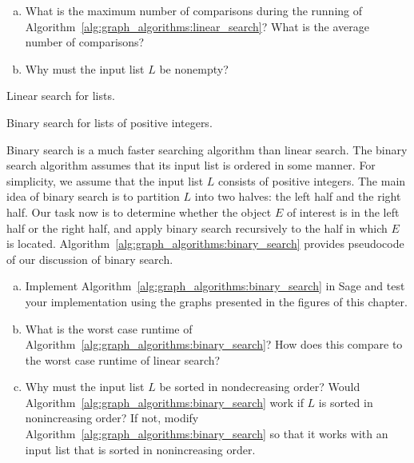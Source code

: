 \begin{problem}
\begin{enumerate}[(a)]
  \item What is the maximum number of comparisons during the running
    of Algorithm~\ref{alg:graph_algorithms:linear_search}? What is the
    average number of comparisons?

  \item Why must the input list $L$ be nonempty?
  \end{enumerate}

\begin{algorithm}[!htbp]

\caption{Linear search for lists.}
\label{alg:graph_algorithms:linear_search}
\end{algorithm}

\begin{algorithm}[!htbp]

\caption{Binary search for lists of positive integers.}
\label{alg:graph_algorithms:binary_search}
\end{algorithm}

\item\label{prob:graph_algorithms:binary_search}
  Binary search is a much faster searching
  algorithm than linear search. The
  binary search algorithm assumes that its input
  list is ordered in some manner. For simplicity, we assume that the
  input list $L$ consists of positive integers. The main idea of
  binary search is to partition $L$ into two
  halves: the left half and the right half. Our task now is to
  determine whether the object $E$ of interest is in the left half or
  the right half, and apply binary search recursively to the half in
  which $E$ is located.
  Algorithm~\ref{alg:graph_algorithms:binary_search} provides
  pseudocode of our discussion of binary search.
  \begin{enumerate}[(a)]
  \item Implement Algorithm~\ref{alg:graph_algorithms:binary_search}
    in Sage and test your implementation using the graphs presented in
    the figures of this chapter.

  \item What is the worst case runtime of
    Algorithm~\ref{alg:graph_algorithms:binary_search}? How does this
    compare to the worst case runtime of linear search?

  \item Why must the input list $L$ be sorted in nondecreasing order?
    Would Algorithm~\ref{alg:graph_algorithms:binary_search} work if
    $L$ is sorted in nonincreasing order? If not, modify
    Algorithm~\ref{alg:graph_algorithms:binary_search} so that it
    works with an input list that is sorted in nonincreasing order.


\end{enumerate}
\end{problem}
